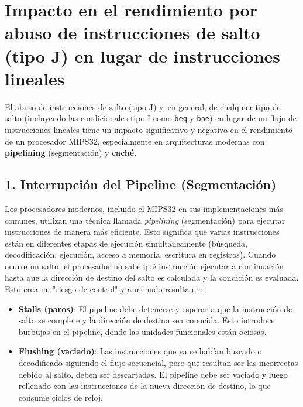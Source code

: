 \documentclass{article}
\begin{document}
\section{Impacto en el rendimiento por abuso de instrucciones de salto (tipo J) en lugar de instrucciones lineales}
El abuso de instrucciones de salto (tipo J) y, en general, de cualquier tipo de salto (incluyendo las condicionales tipo I como \texttt{beq} y \texttt{bne}) en lugar de un flujo de instrucciones lineales tiene un impacto significativo y negativo en el rendimiento de un procesador MIPS32, especialmente en arquitecturas modernas con \textbf{pipelining} (segmentación) y \textbf{caché}.

\subsection*{1. Interrupción del Pipeline (Segmentación)}
Los procesadores modernos, incluido el MIPS32 en sus implementaciones más comunes, utilizan una técnica llamada \textit{pipelining} (segmentación) para ejecutar instrucciones de manera más eficiente. Esto significa que varias instrucciones están en diferentes etapas de ejecución simultáneamente (búsqueda, decodificación, ejecución, acceso a memoria, escritura en registros). Cuando ocurre un salto, el procesador no sabe qué instrucción ejecutar a continuación hasta que la dirección de destino del salto es calculada y la condición es evaluada. Esto crea un "riesgo de control" y a menudo resulta en:
\begin{itemize}
    \item \textbf{Stalls (paros)}: El pipeline debe detenerse y esperar a que la instrucción de salto se complete y la dirección de destino sea conocida. Esto introduce burbujas en el pipeline, donde las unidades funcionales están ociosas.
    \item \textbf{Flushing (vaciado)}: Las instrucciones que ya se habían buscado o decodificado siguiendo el flujo secuencial, pero que resultan ser las incorrectas debido al salto, deben ser descartadas. El pipeline debe ser vaciado y luego rellenado con las instrucciones de la nueva dirección de destino, lo que consume ciclos de reloj.
\end{itemize}
\end{document}
